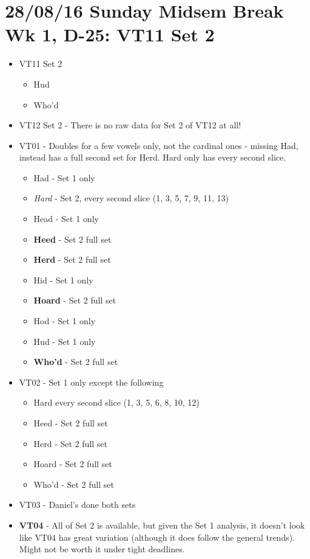 \documentclass{article}
\begin{document}
\section*{28/08/16 Sunday Midsem Break Wk 1, D-25: VT11 Set 2}
\begin{itemize}
    \item VT11 Set 2
    \begin{itemize}
        \item Hud
        \item Who'd
    \end{itemize}
    \item VT12 Set 2 - There is no raw data for Set 2 of VT12 at all!
    \item VT01 - Doubles for a few vowels only, not the cardinal ones - missing Had, instead has a full second set for Herd. Hard only has every second slice.
    \begin{itemize}
        \item Had - Set 1 only
        \item \textit{Hard} - Set 2, every second slice (1, 3, 5, 7, 9, 11, 13)
        \item Head - Set 1 only
        \item \textbf{Heed} - Set 2 full set
        \item \textbf{Herd} - Set 2 full set
        \item Hid - Set 1 only
        \item \textbf{Hoard} - Set 2 full set
        \item Hod - Set 1 only
        \item Hud - Set 1 only
        \item \textbf{Who'd} - Set 2 full set
    \end{itemize}
    \item VT02 - Set 1 only except the following
    \begin{itemize}
        \item Hard every second slice (1, 3, 5, 6, 8, 10, 12)
        \item Heed - Set 2 full set
        \item Herd - Set 2 full set
        \item Hoard - Set 2 full set
        \item Who'd - Set 2 full set
    \end{itemize}
    \item VT03 - Daniel's done both sets
    \item \textbf{VT04} - All of Set 2 is available, but given the Set 1 analysis, it doesn't look like VT04 has great variation (although it does follow the general trends). Might not be worth it under tight deadlines.

\end{itemize}
\end{document}
